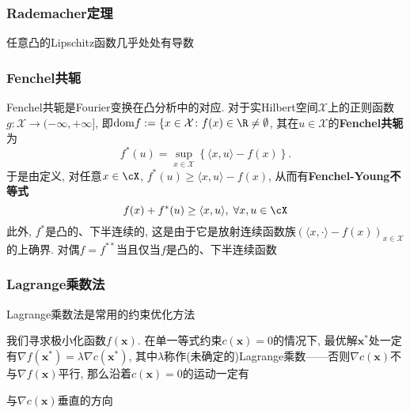 \subsubsection{Rademacher定理}

\begin{theorem}[Rademacher]\label{thm:Rademacher}
	任意凸的Lipschitz函数几乎处处有导数
\end{theorem}


\subsubsection{Fenchel共轭}

Fenchel共轭是Fourier变换在凸分析中的对应. 
对于实Hilbert空间$\mathcal{X}$上的正则函数$g \colon \mathcal{X} \to (-\infty, +\infty]$, 即$\mathrm{dom} f := \{x \in \mathcal{X} \colon f(x) \in \R \neq \emptyset$, 其在$u \in \mathcal{X}$的\textbf{Fenchel共轭}为
\begin{equation}
	f^*(u) = \sup_{x \in \mathcal{X}} \left\{ \langle x, u \rangle - f(x) \right\}. 
\end{equation}
于是由定义, 对任意$x \in \cX$, $f^*(u) \geq \langle x, u \rangle - f(x)$, 从而有\textbf{Fenchel-Young不等式}
\begin{equation}
	f(x) + f^*(u) \geq \langle x, u \rangle,\; \forall x, u \in \cX
\end{equation}
此外, $f^*$是凸的、下半连续的, 这是由于它是放射连续函数族$(\langle x, \cdot \rangle - f(x))_{x \in \mathcal{X}}$的上确界. 
对偶$f = f^{**}$当且仅当$f$是凸的、下半连续函数

\subsubsection{Lagrange乘数法}

Lagrange乘数法是常用的约束优化方法\cite{burges:2004a}

我们寻求极小化函数$f(\bm{x})$. 
在单一等式约束$c(\bm{x}) = 0$的情况下, 最优解$\bm{x}^*$处一定有$\nabla f(\bm{x}^*) = \lambda \nabla c(\bm{x}^*)$, 其中$\lambda$称作(未确定的)Lagrange乘数——否则$\nabla c(\bm{x})$不与$\nabla f(\bm{x})$平行, 那么沿着$c(\bm{x}) = 0$的运动一定有

与$\nabla c(\bm{x})$垂直的方向







































